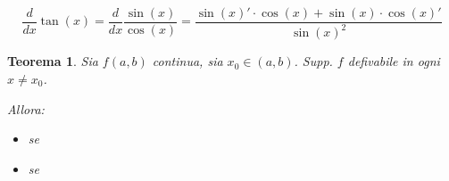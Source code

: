 \documentclass{article}
\newtheorem{theorem}{Teorema}
\begin{document}
\begin{equation}
	\frac{d}{dx} \tan(x) = \frac{d}{dx} \frac{\sin(x)}{\cos(x)} = \frac{\sin(x)' \cdot \cos(x) + \sin(x) \cdot \cos(x)'}{{\sin(x)}^{2} }
\end{equation}

\begin{theorem}
Sia \(f(a, b)\) continua, sia \(x_0 \in (a, b)\). %
Supp. \(f\) defivabile in ogni \(x \neq x_0\).

Allora:
\begin{itemize}
	\item se
	\item se
\end{itemize}
\end{theorem}
\end{document}
